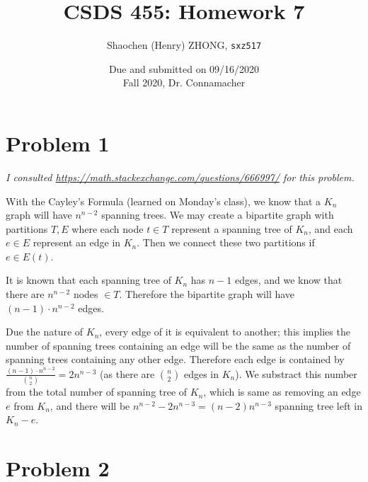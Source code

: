\documentclass[11pt]{article}
\newcommand{\ilc}{\texttt}
\begin{document}
\title{\textbf{CSDS 455: Homework 7}}

\author{Shaochen (Henry) ZHONG, \ilc{sxz517}}
\date{Due and submitted on 09/16/2020 \\ Fall 2020, Dr. Connamacher}
\maketitle

\section*{Problem 1}

\textit{I consulted \url{https://math.stackexchange.com/questions/666997/} for this problem.}\newline

With the Cayley's Formula (learned on Monday's class), we know that a $K_n$ graph will have $n^{n-2}$ spanning trees. We may create a bipartite graph with partitions $T, E$ where each node $t \in T$ represent a spanning tree of $K_n$, and each $e \in E$ represent an edge in $K_n$. Then we connect these two partitions if $e \in E(t)$.

It is known that each spanning tree of $K_n$ has $n-1$ edges, and we know that there are $n^{n-2}$ nodes $\in T$. Therefore the bipartite graph will have $(n-1) \cdot n^{n-2}$ edges. \newline

Due the nature of $K_n$, every edge of it is equivalent to another; this implies the number of spanning trees containing an edge will be the same as the number of spanning trees containing any other edge. Therefore each edge is contained by $\frac{(n-1) \cdot n^{n-2}}{{n \choose 2}} = 2n^{n-3}$ (as there are ${n \choose 2}$ edges in $K_n$). We substract this number from the total number of spanning tree of $K_n$, which is same as removing an edge $e$ from $K_n$, and there will be $ n^{n-2} - 2n^{n-3} = (n-2)n^{n-3}$ spanning tree left in $K_n - e$.

\section*{Problem 2}

%
% 
% 
\end{document}
